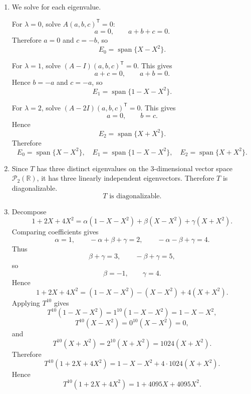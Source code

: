 \documentclass[12pt]{article}
\newcommand{\R}{\mathbb{R}}
\newcommand{\cP}{\mathcal{P}}
\newcommand{\Span}{\operatorname{span}}
\newcommand{\T}{\mathsf{T}}
\begin{document}
\begin{enumerate}[label=(\alph*)]
  \item We solve for each eigenvalue.

  For $\lambda=0$, solve $A(a,b,c)^\T=0$:
  \[
    a=0,
    \qquad
    a+b+c=0.
  \]
  Therefore $a=0$ and $c=-b$, so
  \[
    E_0=\Span\{X-X^2\}.
  \]

  For $\lambda=1$, solve $(A-I)(a,b,c)^\T=0$. This gives
  \[
    a+c=0,
    \qquad
    a+b=0.
  \]
  Hence $b=-a$ and $c=-a$, so
  \[
    E_1=\Span\{1-X-X^2\}.
  \]

  For $\lambda=2$, solve $(A-2I)(a,b,c)^\T=0$. This gives
  \[
    a=0,
    \qquad
    b=c.
  \]
  Hence
  \[
    E_2=\Span\{X+X^2\}.
  \]
  Therefore
  \[
    \boxed{
    E_0=\Span\{X-X^2\},\quad
    E_1=\Span\{1-X-X^2\},\quad
    E_2=\Span\{X+X^2\}.}
  \]

  \item Since $T$ has three distinct eigenvalues on the $3$-dimensional vector space $\cP_2(\R)$, it has three linearly independent eigenvectors. Therefore $T$ is diagonalizable.
  \[
    \boxed{T\text{ is diagonalizable}.}
  \]

  \item Decompose
  \[
    1+2X+4X^2
    =\alpha(1-X-X^2)+\beta(X-X^2)+\gamma(X+X^2).
  \]
  Comparing coefficients gives
  \[
    \alpha=1,
    \qquad
    -\alpha+\beta+\gamma=2,
    \qquad
    -\alpha-\beta+\gamma=4.
  \]
  Thus
  \[
    \beta+\gamma=3,
    \qquad
    -\beta+\gamma=5,
  \]
  so
  \[
    \beta=-1,
    \qquad
    \gamma=4.
  \]
  Hence
  \[
    1+2X+4X^2=(1-X-X^2)-(X-X^2)+4(X+X^2).
  \]
  Applying $T^{10}$ gives
  \[
    T^{10}(1-X-X^2)=1^{10}(1-X-X^2)=1-X-X^2,
  \]
  \[
    T^{10}(X-X^2)=0^{10}(X-X^2)=0,
  \]
  and
  \[
    T^{10}(X+X^2)=2^{10}(X+X^2)=1024(X+X^2).
  \]
  Therefore
  \[
    T^{10}(1+2X+4X^2)
    =1-X-X^2+4\cdot 1024(X+X^2).
  \]
  Hence
  \[
    \boxed{T^{10}(1+2X+4X^2)=1+4095X+4095X^2.}
  \]
\end{enumerate}

\newpage
\end{document}
